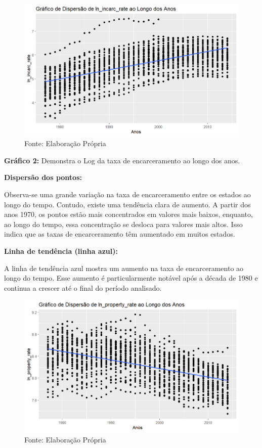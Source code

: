 \documentclass[12pt]{article}
\begin{document}
\begin{figure}[H]
    \centering
    \includegraphics[width=1\linewidth]{grafico2final.png}
    \caption{Fonte: Elaboração Própria}
    \label{fig:enter-label}
\end{figure}

\textbf{Gráfico 2:} Demonstra o Log da taxa de encarceramento ao longo
dos anos.

\textbf{Dispersão dos pontos:}

Observa-se uma grande variação na taxa de encarceramento entre os
estados ao longo do tempo. Contudo, existe uma tendência clara de
aumento. A partir dos anos 1970, os pontos estão mais concentrados em
valores mais baixos, enquanto, ao longo do tempo, essa concentração se
desloca para valores mais altos. Isso indica que as taxas de
encarceramento têm aumentado em muitos estados.

\textbf{Linha de tendência (linha azul):}

A linha de tendência azul mostra um aumento na taxa de encarceramento ao
longo do tempo. Esse aumento é particularmente notável após a década de
1980 e continua a crescer até o final do período analisado.

\begin{figure}[H]
    \centering
    \includegraphics[width=1\linewidth]{grafico3final.png}
    \caption{Fonte: Elaboração Própria}
    \label{fig:enter-label}
\end{figure}
\end{document}
